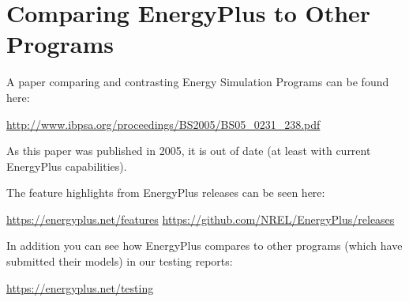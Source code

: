 \section{Comparing EnergyPlus to Other Programs}\label{comparing-energyplus-to-other-programs}

A paper comparing and contrasting Energy Simulation Programs can be found here:

\url{http://www.ibpsa.org/proceedings/BS2005/BS05_0231_238.pdf}

As this paper was published in 2005, it is out of date (at least with current EnergyPlus capabilities).

The feature highlights from EnergyPlus releases can be seen here:

\url{https://energyplus.net/features}
\url{https://github.com/NREL/EnergyPlus/releases}

In addition you can see how EnergyPlus compares to other programs (which have submitted their models) in our testing reports:

\url{https://energyplus.net/testing}
